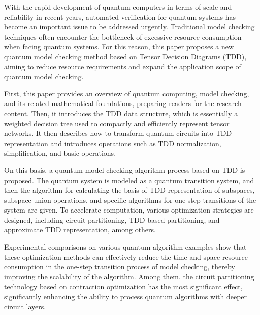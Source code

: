 
With the rapid development of quantum computers in terms of scale and reliability in recent years, automated verification for quantum systems has become an important issue to be addressed urgently. Traditional model checking techniques often encounter the bottleneck of excessive resource consumption when facing quantum systems. For this reason, this paper proposes a new quantum model checking method based on Tensor Decision Diagrams (TDD), aiming to reduce resource requirements and expand the application scope of quantum model checking.

First, this paper provides an overview of quantum computing, model checking, and its related mathematical foundations, preparing readers for the research content. Then, it introduces the TDD data structure, which is essentially a weighted decision tree used to compactly and efficiently represent tensor networks. It then describes how to transform quantum circuits into TDD representation and introduces operations such as TDD normalization, simplification, and basic operations.

On this basis, a quantum model checking algorithm process based on TDD is proposed. The quantum system is modeled as a quantum transition system, and then the algorithm for calculating the basis of TDD representation of subspaces, subspace union operations, and specific algorithms for one-step transitions of the system are given. To accelerate computation, various optimization strategies are designed, including circuit partitioning, TDD-based partitioning, and approximate TDD representation, among others.

Experimental comparisons on various quantum algorithm examples show that these optimization methods can effectively reduce the time and space resource consumption in the one-step transition process of model checking, thereby improving the scalability of the algorithm. Among them, the circuit partitioning technology based on contraction optimization has the most significant effect, significantly enhancing the ability to process quantum algorithms with deeper circuit layers.

